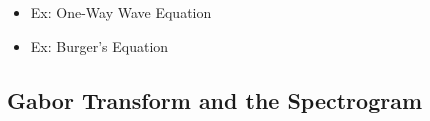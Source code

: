 \documentclass[11.5pt,a4paper]{article}
\begin{document}
\begin{itemize}
\begin{itemize}
        \hl{\textit{The "Fourier Transform pair" equations are used to get the above solution.}}
        
        \item Using FFT, one can get a similar equation:
        \begin{equation*}
            \hat{u}(t) = -\alpha^2\kappa^2\hat{u}
        \end{equation*}
        Where $\kappa$ is discretized frequency
        \item Code to solve this PDE numerically (Using Julia Lang):
    \end{itemize}
    \item Ex: One-Way Wave Equation
    \item Ex: Burger's Equation
\end{itemize}

\subsection*{Gabor Transform and the Spectrogram}
\end{document}
